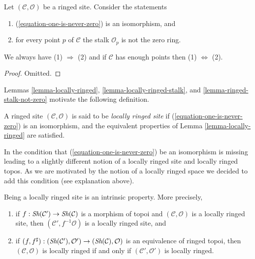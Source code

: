 \begin{lemma}
\label{lemma-ringed-stalk-not-zero}
Let $(\mathcal{C}, \mathcal{O})$ be a ringed site. Consider the statements
\begin{enumerate}
\item (\ref{equation-one-is-never-zero}) is an isomorphism, and
\item for every point $p$ of $\mathcal{C}$ the stalk $\mathcal{O}_p$
is not the zero ring.
\end{enumerate}
We always have (1) $\Rightarrow$ (2) and if $\mathcal{C}$ has enough points
then (1) $\Leftrightarrow$ (2).
\end{lemma}

\begin{proof}
Omitted.
\end{proof}

\noindent
Lemmas \ref{lemma-locally-ringed},
\ref{lemma-locally-ringed-stalk}, and
\ref{lemma-ringed-stalk-not-zero}
motivate the following definition.

\begin{definition}
\label{definition-locally-ringed}
A ringed site $(\mathcal{C}, \mathcal{O})$ is said to be
{\it locally ringed site} if (\ref{equation-one-is-never-zero})
is an isomorphism, and the equivalent properties of
Lemma \ref{lemma-locally-ringed}
are satisfied.
\end{definition}

\noindent
In \cite[Expos\'e IV, Exercice 13.9]{SGA4} the condition that
(\ref{equation-one-is-never-zero}) be an isomorphism is missing leading to
a slightly different notion of a locally ringed site and locally ringed
topos. As we are motivated by the notion of a locally ringed space we decided
to add this condition (see explanation above).

\begin{lemma}
\label{lemma-locally-ringed-intrinsic}
Being a locally ringed site is an intrinsic property.
More precisely,
\begin{enumerate}
\item if $f : \mathop{\textit{Sh}}\nolimits(\mathcal{C}') \to \mathop{\textit{Sh}}\nolimits(\mathcal{C})$
is a morphism of topoi and $(\mathcal{C}, \mathcal{O})$ is
a locally ringed site, then $(\mathcal{C}', f^{-1}\mathcal{O})$
is a locally ringed site, and
\item if
$(f, f^\sharp) : (\mathop{\textit{Sh}}\nolimits(\mathcal{C}'), \mathcal{O}')
\to (\mathop{\textit{Sh}}\nolimits(\mathcal{C}), \mathcal{O})$
is an equivalence of ringed topoi, then
$(\mathcal{C}, \mathcal{O})$ is locally ringed if and only if
$(\mathcal{C}', \mathcal{O}')$
is locally ringed.
\end{enumerate}
\end{lemma}

